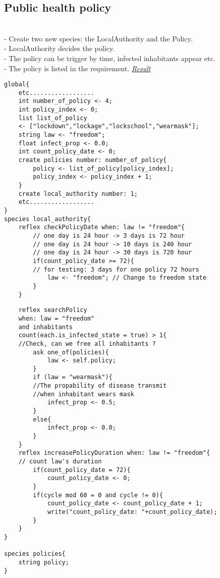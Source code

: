 \documentclass{article}
\begin{document}
\begin{pic15}
\begin{pic15}
\section{Public health policy}
\\- Create two new species: the LocalAuthority and the Policy.
\\- LocalAuthority decides the policy.
\\- The policy can be trigger by time, infected inhabitants appear etc.
\\- The policy is listed in the requirement.
\newline\newline
\underline{\emph{Result}}
\newline\newline
\begin{tcolorbox}
\begin{lstlisting}
global{
	etc..................
	int number_of_policy <- 4;
	int policy_index <- 0;
	list list_of_policy 
	<- ["lockdown","lockage","lockschool","wearmask"];
	string law <- "freedom";
	float infect_prop <- 0.0;
	int count_policy_date <- 0;
	create policies number: number_of_policy{
		policy <- list_of_policy[policy_index];
		policy_index <- policy_index + 1;
	}
	create local_authority number: 1;
	etc..................
}
species local_authority{
	reflex checkPolicyDate when: law != "freedom"{
		// one day is 24 hour -> 3 days is 72 hour
		// one day is 24 hour -> 10 days is 240 hour
		// one day is 24 hour -> 30 days is 720 hour
		if(count_policy_date >= 72){
		// for testing: 3 days for one policy 72 hours
			law <- "freedom"; // Change to freedom state
		}
	}
\end{lstlisting}
\end{tcolorbox}
\begin{tcolorbox}
\begin{lstlisting}
	reflex searchPolicy 
	when: law = "freedom" 
	and inhabitants 
	count(each.is_infected_state = true) > 1{
	//Check, can we free all inhabitants ?
		ask one_of(policies){
			law <- self.policy;
		}
		if (law = "wearmask"){
		//The propability of disease transmit 
		//when inhabitant wears mask
			infect_prop <- 0.5; 
		}
		else{
			infect_prop <- 0.0;
		}
	}
	reflex increasePolicyDuration when: law != "freedom"{
	// count law's duration
		if(count_policy_date = 72){
			count_policy_date <- 0;
		}
		if(cycle mod 60 = 0 and cycle != 0){
			count_policy_date <- count_policy_date + 1;
			write("count_policy_date: "+count_policy_date);
		}
	}
}

species policies{
	string policy;
}


\end{lstlisting}
\end{tcolorbox}
\end{pic15}
\end{pic15}
\end{document}

